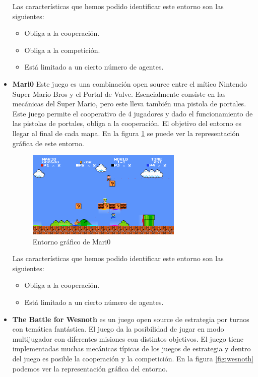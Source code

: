 \begin{itemize}
	      Las características que hemos podido identificar este entorno son las siguientes:
	      \begin{itemize}
		      \item Obliga a la cooperación.
		      \item Obliga a la competición.
		      \item Está limitado a un cierto número de agentes.
	      \end{itemize}

	\item \textbf{Mari0} \cite{mari0} Este juego es una combinación open source entre el mítico Nintendo Super Mario Bros y el Portal de Valve. Esencialmente consiste en las mecánicas del Super Mario, pero este lleva también una pistola de portales. Este juego permite el cooperativo de 4 jugadores y dado el funcionamiento de las pistolas de portales, obliga a la cooperación. El objetivo del entorno es llegar al final de cada mapa. En la figura \ref {fig:mari0} se puede ver la representación gráfica de este entorno.

	      \begin{figure}[ht]
		      \centering
		      \includegraphics[width=0.7\textwidth]{img/mari0-1.png}
		      \caption{Entorno gráfico de Mari0 \cite{mari0}}
		      \label{fig:mari0}
	      \end{figure}

	      Las características que hemos podido identificar este entorno son las siguientes:
	      \begin{itemize}
		      \item Obliga a la cooperación.
		      \item Está limitado a un cierto número de agentes.
	      \end{itemize}

	\item \textbf{The Battle for Wesnoth} \cite{wesnoth} es un juego open source de estrategia por turnos con temática fantástica. El juego da la posibilidad de jugar en modo multijugador con diferentes misiones con distintos objetivos. El juego tiene implementadas muchas mecánicas típicas de los juegos de estrategia y dentro del juego es posible la cooperación y la competición. En la figura \ref {fig:wesnoth} podemos ver la representación gráfica del entorno.


\end{itemize}
